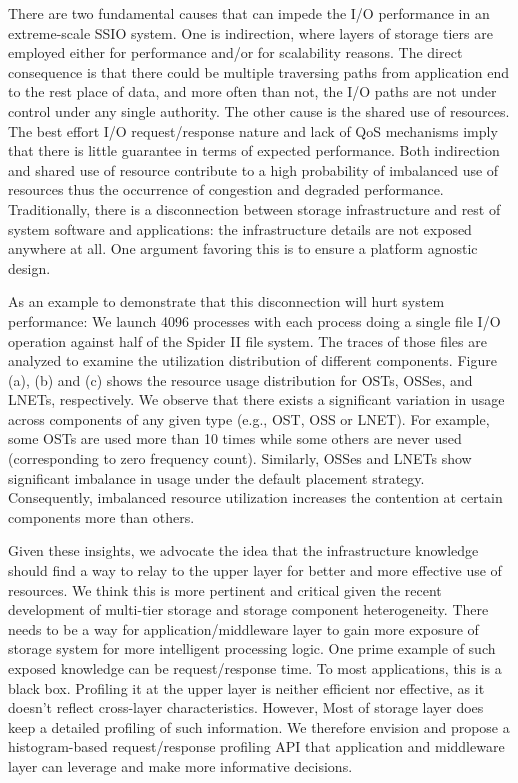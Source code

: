 There are two fundamental causes that can impede the I/O performance in an extreme-scale SSIO system. One is indirection, where layers of storage tiers are employed either for performance and/or for scalability reasons.  The direct consequence is that there could be multiple traversing paths from application end to the rest place of data, and more often than not, the I/O paths are not under control under any single authority. The other cause is the shared use of resources. The best effort I/O request/response nature and lack of QoS mechanisms imply that there is little guarantee in terms of expected performance.  Both indirection and shared use of resource contribute to a high probability of imbalanced use of resources thus the occurrence of congestion and degraded performance. Traditionally, there is a disconnection between storage infrastructure and rest of system software and applications: the infrastructure details are not exposed anywhere at all. One argument favoring this is to ensure a platform agnostic design. 

As an example to demonstrate that this disconnection will hurt system performance: We launch 4096 processes with each process doing a single file I/O operation against half of the Spider II file system. The traces of those files are analyzed to examine the utilization distribution of different components. Figure (a), (b) and (c) shows the resource usage distribution for OSTs, OSSes, and LNETs, respectively. We observe that there exists a significant variation in usage across components of any given type (e.g., OST, OSS or LNET). For example, some OSTs are used more than 10 times while some others are never used (corresponding to zero frequency count). Similarly, OSSes and LNETs show significant imbalance in usage under the default placement strategy. Consequently, imbalanced resource utilization increases the contention at certain components more than others. 

Given these insights, we advocate the idea that the infrastructure knowledge should find a way to relay to the upper layer for better and more effective use of resources.   We think this is more pertinent and critical given the recent development of multi-tier storage and storage component heterogeneity.  There needs to be a way for application/middleware layer to gain more exposure of storage system for more intelligent processing logic.  One prime example of such exposed knowledge can be request/response time. To most applications, this is a black box. Profiling it at the upper layer is neither efficient nor effective, as it doesn't reflect cross-layer characteristics. However, Most of storage layer does keep a detailed profiling of such information. We therefore envision and propose a histogram-based request/response profiling API that application and middleware layer can leverage and make more informative decisions.

